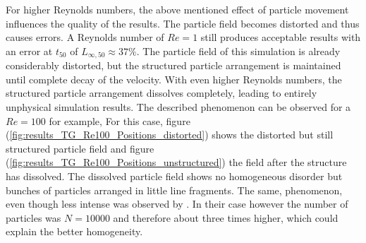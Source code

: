 \documentclass{report}
\begin{document}
For higher Reynolds numbers, the above mentioned effect of particle movement influences the quality of the results. The particle field becomes distorted and thus causes errors. A Reynolds number of $Re=1$ still produces acceptable results with an error at $t_{50}$ of $L_{\infty,50}\approx37\%$. The particle field of this simulation is already considerably distorted, but the structured particle arrangement is maintained until complete decay of the velocity. With even higher Reynolds numbers, the structured particle arrangement dissolves completely, leading to entirely unphysical simulation results. The described phenomenon can be observed for a $Re=100$ for example, For this case, figure (\ref{fig:results_TG_Re100_Positions_distorted}) shows the distorted but still structured particle field and figure (\ref{fig:results_TG_Re100_Positions_unstructured}) the field after the structure has dissolved. The dissolved particle field shows no homogeneous disorder but bunches of particles arranged in little line fragments. The same, phenomenon, even though less intense was observed by \cite{Ellero2007}. In their case however the number of particles was $N=10000$ and therefore about three times higher, which could explain the better homogeneity.
\end{document}
